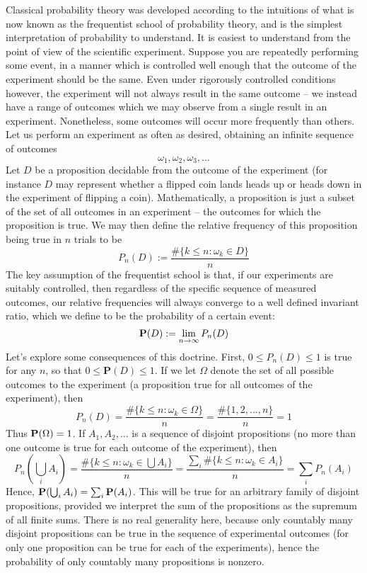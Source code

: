 Classical probability theory was developed according to the intuitions of what is now known as the frequentist school of probability theory, and is the simplest interpretation of probability to understand. It is easiest to understand from the point of view of the scientific experiment. Suppose you are repeatedly performing some event, in a manner which is controlled well enough that the outcome of the experiment should be the same. Even under rigorously controlled conditions however, the experiment will not always result in the same outcome -- we instead have a range of outcomes which we may observe from a single result in an experiment. Nonetheless, some outcomes will occur more frequently than others. Let us perform an experiment as often as desired, obtaining an infinite sequence of outcomes
%
\[ \omega_1, \omega_2, \omega_3, \dots \]
%
Let $D$ be a proposition decidable from the outcome of the experiment (for instance $D$ may represent whether a flipped coin lands heads up or heads down in the experiment of flipping a coin). Mathematically, a proposition is just a subset of the set of all outcomes in an experiment -- the outcomes for which the proposition is true. We may then define the relative frequency of this proposition being true in $n$ trials to be
%
\[ P_n(D) := \frac{\# \{ k \leq n : \omega_k \in D \}}{n} \]
%
The key assumption of the frequentist school is that, if our experiments are suitably controlled, then regardless of the specific sequence of measured outcomes, our relative frequencies will always converge to a well defined invariant ratio, which we define to be the probability of a certain event:
%
\[ \operatorname{\mathbf{P}}(D) := \lim_{n \to \infty} P_n(D) \]
%
Let's explore some consequences of this doctrine. First, $0 \leq P_n(D) \leq 1$ is true for any $n$, so that $0 \leq \mathbf{P}(D) \leq 1$. If we let $\Omega$ denote the set of all possible outcomes to the experiment (a proposition true for all outcomes of the experiment), then
%
\[ P_n(D) = \frac{\# \{ k \leq n : \omega_k \in \Omega\}}{n} = \frac{\# \{ 1, 2, \dots, n \}}{n} = 1 \]
%
Thus $\operatorname{\mathbf{P}}(\Omega) = 1$. If $A_1, A_2, \dots$ is a sequence of disjoint propositions (no more than one outcome is true for each outcome of the experiment), then
%
\[ P_n \left( \bigcup_i A_i \right) = \frac{\# \{ k \leq n : \omega_k \in \bigcup A_i \}}{n} = \frac{\sum_i \# \{ k \leq n : \omega_k \in A_i \}}{n} = \sum_i P_n(A_i) \]
%
Hence, $\operatorname{\mathbf{P}}(\bigcup_i A_i) = \sum_i \operatorname{\mathbf{P}}(A_i)$. This will be true for an arbitrary family of disjoint propositions, provided we interpret the sum of the propositions as the supremum of all finite sums. There is no real generality here, because only countably many disjoint propositions can be true in the sequence of experimental outcomes (for only one proposition can be true for each of the experiments), hence the probability of only countably many propositions is nonzero.

